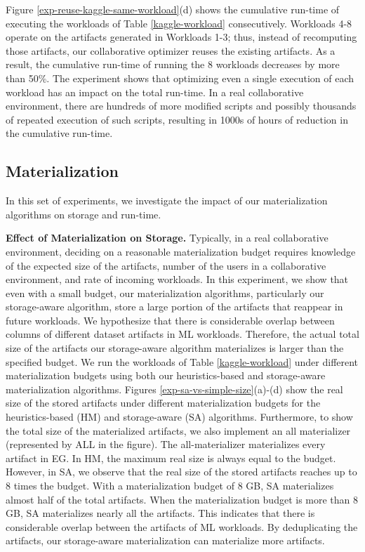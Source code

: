 Figure \ref{exp-reuse-kaggle-same-workload}(d) shows the cumulative run-time of executing the workloads of Table \ref{kaggle-workload} consecutively.
Workloads 4-8 operate on the artifacts generated in Workloads 1-3; thus, instead of recomputing those artifacts, our collaborative optimizer reuses the existing artifacts.
As a result, the cumulative run-time of running the 8 workloads decreases by more than 50\%.
The experiment shows that optimizing even a single execution of each workload has an impact on the total run-time.
In a real collaborative environment, there are hundreds of more modified scripts and possibly thousands of repeated execution of such scripts, resulting in 1000s of hours of reduction in the cumulative run-time.

\subsection{Materialization}
In this set of experiments, we investigate the impact of our materialization algorithms on storage and run-time.

\textbf{Effect of Materialization on Storage.}
Typically, in a real collaborative environment, deciding on a reasonable materialization budget requires knowledge of the expected size of the artifacts, number of the users in a collaborative environment, and rate of incoming workloads.
In this experiment, we show that even with a small budget, our materialization algorithms, particularly our storage-aware algorithm, store a large portion of the artifacts that reappear in future workloads.
We hypothesize that there is considerable overlap between columns of different dataset artifacts in ML workloads.
Therefore, the actual total size of the artifacts our storage-aware algorithm materializes is larger than the specified budget.
We run the workloads of Table \ref{kaggle-workload} under different materialization budgets using both our heuristics-based and storage-aware materialization algorithms.
Figures \ref{exp-sa-vs-simple-size}(a)-(d) show the real size of the stored artifacts under different materialization budgets for the heuristics-based (HM) and storage-aware (SA) algorithms.
Furthermore, to show the total size of the materialized artifacts, we also implement an all materializer (represented by ALL in the figure).
The all-materializer materializes every artifact in EG.
In HM, the maximum real size is always equal to the budget.
However, in SA, we observe that the real size of the stored artifacts reaches up to 8 times the budget.
With a materialization budget of 8 GB, SA materializes almost half of the total artifacts.
When the materialization budget is more than 8 GB, SA materializes nearly all the artifacts.
This indicates that there is considerable overlap between the artifacts of ML workloads.
By deduplicating the artifacts, our storage-aware materialization can materialize more artifacts.

